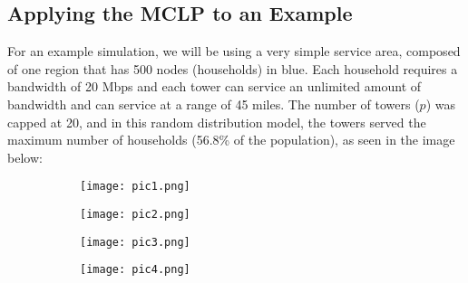 	\subsection{Applying the MCLP to an Example}
	For an example simulation, we will be using a very simple service area, composed of one region that has 500 nodes (households) in blue. Each household requires a bandwidth of 20 Mbps and each tower can service an unlimited amount of bandwidth and can service at a range of 45 miles. The number of towers ($p$) was capped at 20, and in this random distribution model, the towers served the maximum number of households (56.8\% of the population), as seen in the image below:
	\begin{figure}[p]
	\begin{subfigure}{.5\textwidth}
  	\texttt{[image: pic1.png]}
	\end{subfigure}%
	\begin{subfigure}{.5\textwidth}
  	\texttt{[image: pic2.png]}
	\end{subfigure}
	\end{figure}
	\begin{figure}[p]
	\caption*{In the below image, we see a representation of the same scenario but with 40 stations, 45 range, 50mbps per household, and 650mbps throughput.}
	\begin{subfigure}{.5\textwidth}
  	\texttt{[image: pic3.png]}
	\end{subfigure}%
	\begin{subfigure}{.5\textwidth}
  	\texttt{[image: pic4.png]}
	\end{subfigure}
	\end{figure}
	
	\cleardoublepage
